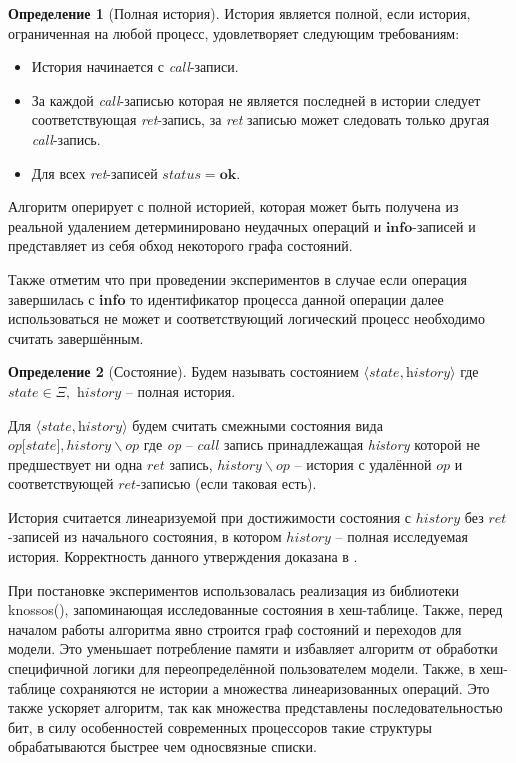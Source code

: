 \documentclass[pdftex,ptm,14pt,a4paper]{extreport}
\theoremstyle{definition}
\newtheorem{definition}{Определение}[chapter]
\begin{document}
\begin{definition}[Полная история]
    История является полной, если история, ограниченная на любой процесс, удовлетворяет следующим требованиям:
    \begin{itemize}
        \item История начинается с \textit{call}-записи.
        \item За каждой \textit{call}-записью которая не является последней в истории
            следует соответствующая \textit{ret}-запись,
            за \textit{ret} записью может следовать только другая \textit{call}-запись.
        \item Для всех \textit{ret}-записей $\textit{status} = \textbf{ok}.$
    \end{itemize}
\end{definition}

Алгоритм оперирует с полной историей, которая может быть получена из реальной удалением
детерминировано неудачных операций и $\textbf{info}$-записей и представляет из себя обход некоторого графа состояний.

Также отметим что при проведении экспериментов в случае если операция завершилась с \textbf{info}
то идентификатор процесса данной операции далее использоваться не может и соответствующий
логический процесс необходимо считать завершённым.

\begin{definition}[Состояние]
    Будем называть состоянием $\langle \textit{state}, \textit{history} \rangle$ где
    $\textit{state} \in \Xi,$ $\textit{history}$ -- полная история.
\end{definition}

Для $\langle \textit{state}, \textit{history} \rangle$ будем считать смежными
состояния вида $op\lbrack state\rbrack, history \backslash op$ где
\textit{op} -- $call$ запись принадлежащая \textit{history} которой не предшествует ни одна
$ret$ запись, $history \backslash op$ -- история с удалённой $op$ и соответствующей $ret$-записью
(если таковая есть).

История считается линеаризуемой при достижимости состояния с $history$ без $ret$-записей из начального
состояния, в котором $history$ -- полная исследуемая история. Корректность данного утверждения
доказана в \cite{wing-testing}.

При постановке экспериментов использовалась реализация из библиотеки knossos(\cite{knossos}),
запоминающая исследованные состояния в хеш-таблице. Также, перед началом работы алгоритма явно строится
граф состояний и переходов для модели. Это уменьшает потребление памяти и
избавляет алгоритм от обработки специфичной логики для переопределённой пользователем модели.
Также, в хеш-таблице сохраняются не истории а множества линеаризованных операций. Это также ускоряет
алгоритм, так как множества представлены последовательностью бит, в силу особенностей современных процессоров
такие структуры обрабатываются быстрее чем односвязные списки.
\end{document}
